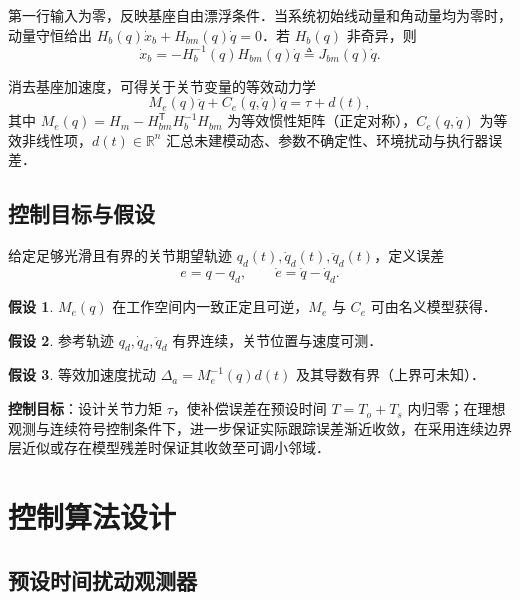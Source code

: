 \documentclass[12pt,a4paper]{article}
\theoremstyle{definition}
\newtheorem{assumption}{假设}[section]
\theoremstyle{remark}
\newcommand{\R}{\mathbb{R}}
\newcommand{\T}{\mathsf{T}}
\begin{document}
第一行输入为零，反映基座自由漂浮条件．当系统初始线动量和角动量均为零时，动量守恒给出 $H_b(q)\dot x_b+H_{bm}(q)\dot q=0$．若 $H_b(q)$ 非奇异，则
\begin{equation}
  \dot x_b=-H_b^{-1}(q)H_{bm}(q)\dot q\triangleq J_{bm}(q)\dot q .
\end{equation}

消去基座加速度，可得关于关节变量的等效动力学
\begin{equation}\label{eq:de}
  M_e(q)\ddot q+C_e(q,\dot q)\dot q=\tau+d(t),
\end{equation}
其中 $M_e(q)=H_m-H_{bm}^\T H_b^{-1}H_{bm}$ 为等效惯性矩阵（正定对称），$C_e(q,\dot q)$ 为等效非线性项，$d(t)\in\R^n$ 汇总未建模动态、参数不确定性、环境扰动与执行器误差．

\subsection{控制目标与假设}

给定足够光滑且有界的关节期望轨迹 $q_d(t),\dot q_d(t),\ddot q_d(t)$，定义误差
\begin{equation}
  e=q-q_d,\qquad \dot e=\dot q-\dot q_d .
\end{equation}

\begin{assumption}\label{as:1}
$M_e(q)$ 在工作空间内一致正定且可逆，$M_e$ 与 $C_e$ 可由名义模型获得．
\end{assumption}

\begin{assumption}\label{as:2}
参考轨迹 $q_d,\dot q_d,\ddot q_d$ 有界连续，关节位置与速度可测．
\end{assumption}

\begin{assumption}\label{as:3}
等效加速度扰动 $\Delta_a=M_e^{-1}(q)d(t)$ 及其导数有界（上界可未知）．
\end{assumption}

\noindent\textbf{控制目标}：设计关节力矩 $\tau$，使补偿误差在预设时间 $T=T_o+T_s$ 内归零；在理想观测与连续符号控制条件下，进一步保证实际跟踪误差渐近收敛，在采用连续边界层近似或存在模型残差时保证其收敛至可调小邻域．


\section{控制算法设计}

\subsection{预设时间扰动观测器}
\end{document}
